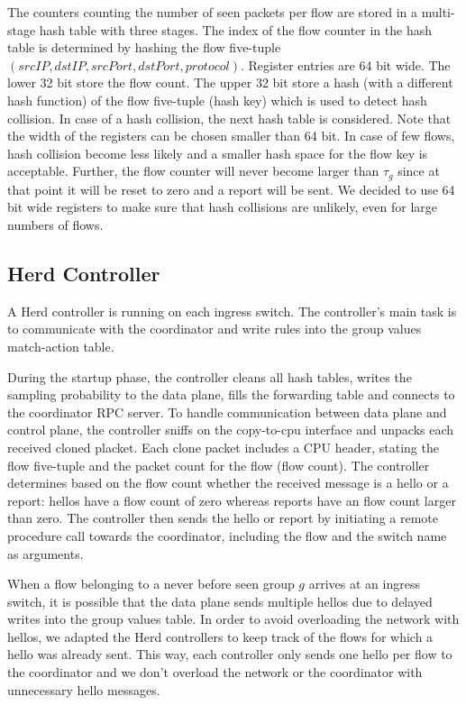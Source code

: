 \documentclass[11pt,oneside,a4paper]{article}
\begin{document}
The counters counting the number of seen packets per flow are stored in a multi-stage hash table with three stages. The index of the flow counter in the hash table is determined by hashing the flow five-tuple $(srcIP, dstIP, srcPort, dstPort, protocol)$. Register entries are 64 bit wide. The lower 32 bit store the flow count. The upper 32 bit store a hash (with a different hash function) of the flow five-tuple (hash key) which is used to detect hash collision. In case of a hash collision, the next hash table is considered. Note that the width of the registers can be chosen smaller than 64 bit. In case of few flows, hash collision become less likely and a smaller hash space for the flow key is acceptable. Further, the flow counter will never become larger than $\tau_g$ since at that point it will be reset to zero and a report will be sent. We decided to use 64 bit wide registers to make sure that hash collisions are unlikely, even for large numbers of flows.

\subsection{Herd Controller} \label{controller}

A Herd controller is running on each ingress switch. The controller's main task is to communicate with the coordinator and write rules into the group values match-action table.

\noindent During the startup phase, the controller cleans all hash tables, writes the sampling probability to the data plane, fills the forwarding table and connects to the coordinator RPC server. To handle communication between data plane and control plane, the controller sniffs on the copy-to-cpu interface and unpacks each received cloned placket. Each clone packet includes a CPU header, stating the flow five-tuple and the packet count for the flow (flow count). The controller determines based on the flow count whether the received message is a hello or a report: hellos have a flow count of zero whereas reports have an flow count larger than zero. The controller then sends the hello or report by initiating a remote procedure call towards the coordinator, including the flow and the switch name as arguments.

\noindent When a flow belonging to a never before seen group $g$ arrives at an ingress switch, it is possible that the data plane sends multiple hellos due to delayed writes into the group values table. In order to avoid overloading the network with hellos, we adapted the Herd controllers to keep track of the flows for which a hello was already sent. This way, each controller only sends one hello per flow to the coordinator and we don't overload the network or the coordinator with unnecessary hello messages.
\end{document}
